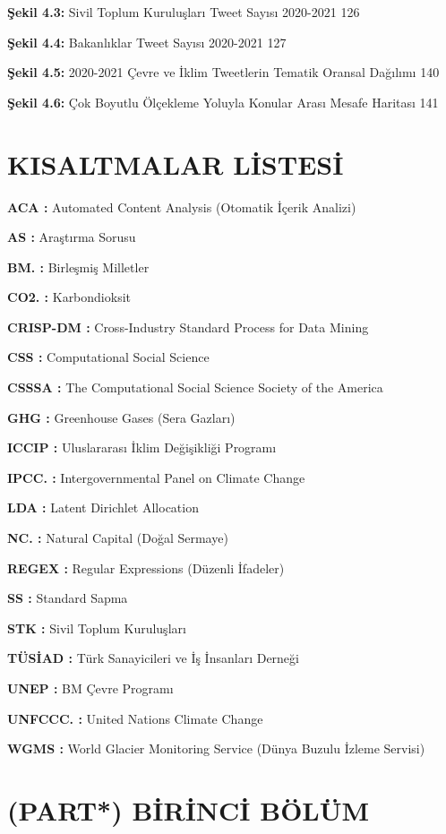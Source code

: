 \documentclass[
]{book}
\begin{document}
\textbf{Şekil 4.3:} Sivil Toplum Kuruluşları Tweet Sayısı 2020-2021 126

\textbf{Şekil 4.4:} Bakanlıklar Tweet Sayısı 2020-2021 127

\textbf{Şekil 4.5:} 2020-2021 Çevre ve İklim Tweetlerin Tematik Oransal Dağılımı 140

\textbf{Şekil 4.6:} Çok Boyutlu Ölçekleme Yoluyla Konular Arası Mesafe Haritası 141

\hypertarget{kisaltmalar-listesi}{%
\chapter*{KISALTMALAR LİSTESİ}\label{kisaltmalar-listesi}}

\textbf{ACA :} Automated Content Analysis (Otomatik İçerik Analizi)

\textbf{AS :} Araştırma Sorusu

\textbf{BM. :} Birleşmiş Milletler

\textbf{CO2. :} Karbondioksit

\textbf{CRISP-DM :} Cross-Industry Standard Process for Data Mining

\textbf{CSS :} Computational Social Science

\textbf{CSSSA :} The Computational Social Science Society of the America

\textbf{GHG :} Greenhouse Gases (Sera Gazları)

\textbf{ICCIP :} Uluslararası İklim Değişikliği Programı

\textbf{IPCC. :} Intergovernmental Panel on Climate Change

\textbf{LDA :} Latent Dirichlet Allocation

\textbf{NC. :} Natural Capital (Doğal Sermaye)

\textbf{REGEX :} Regular Expressions (Düzenli İfadeler)

\textbf{SS :} Standard Sapma

\textbf{STK :} Sivil Toplum Kuruluşları

\textbf{TÜSİAD :} Türk Sanayicileri ve İş İnsanları Derneği

\textbf{UNEP :} BM Çevre Programı

\textbf{UNFCCC. :} United Nations Climate Change

\textbf{WGMS :} World Glacier Monitoring Service (Dünya Buzulu İzleme Servisi)

\hypertarget{part-birinci-buxf6luxfcm}{%
\chapter*{\texorpdfstring{(PART*) \textbf{BİRİNCİ BÖLÜM}}{(PART*) BİRİNCİ BÖLÜM}}\label{part-birinci-buxf6luxfcm}}
\end{document}

